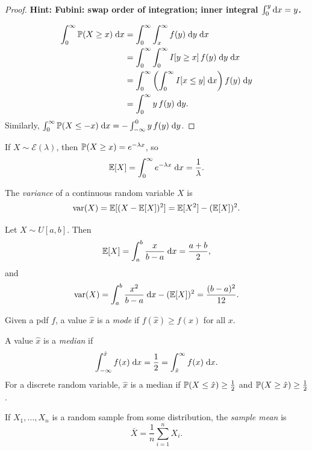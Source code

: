 \documentclass[a4paper]{article}
\begin{document}
\begin{proof}
  \textbf{Hint: Fubini: swap order of integration; inner integral $\int_0^y \d x = y$.}

  \begin{align*}
    \int_0^\infty \P(X \geq x)\;\d x &= \int_0^\infty \int_x^\infty f(y)\;\d y\;\d x\\
    &= \int_0^\infty \int_0^\infty I[y \geq x]\,f(y)\;\d y\;\d x\\
    &= \int_0^\infty \left(\int_0^\infty I[x \leq y]\;\d x\right) f(y)\;\d y\\
    &= \int_0^\infty y\,f(y)\;\d y.
  \end{align*}
  Similarly, $\int_0^\infty \P(X \leq -x)\;\d x = -\int_{-\infty}^0 y\,f(y)\;\d y$.
\end{proof}

\begin{eg}
  If $X \sim \mathcal{E}(\lambda)$, then $\P(X \geq x) = e^{-\lambda x}$, so
  \[
    \E[X] = \int_0^\infty e^{-\lambda x}\;\d x = \frac{1}{\lambda}.
  \]
\end{eg}

\begin{defi}[Variance]
  The \emph{variance} of a continuous random variable $X$ is
  \[
    \var(X) = \E[(X - \E[X])^2] = \E[X^2] - (\E[X])^2.
  \]
\end{defi}

\begin{eg}
  Let $X \sim U[a, b]$. Then
  \[
    \E[X] = \int_a^b \frac{x}{b - a}\;\d x = \frac{a + b}{2},
  \]
  and
  \[
    \var(X) = \int_a^b \frac{x^2}{b - a}\;\d x - (\E[X])^2 = \frac{(b - a)^2}{12}.
  \]
\end{eg}

\begin{defi}
  Given a pdf $f$, a value $\hat{x}$ is a \emph{mode} if $f(\hat{x}) \geq f(x)$ for all $x$.

  A value $\hat{x}$ is a \emph{median} if
  \[
    \int_{-\infty}^{\hat{x}} f(x)\;\d x = \frac{1}{2} = \int_{\hat{x}}^\infty f(x)\;\d x.
  \]
  For a discrete random variable, $\hat{x}$ is a median if $\P(X \leq \hat{x}) \geq \frac{1}{2}$ and $\P(X \geq \hat{x}) \geq \frac{1}{2}$.
\end{defi}

\begin{defi}
  If $X_1, \dotsc, X_n$ is a random sample from some distribution, the \emph{sample mean} is
  \[
    \bar{X} = \frac{1}{n} \sum_{i=1}^n X_i.
  \]
\end{defi}
\end{document}
